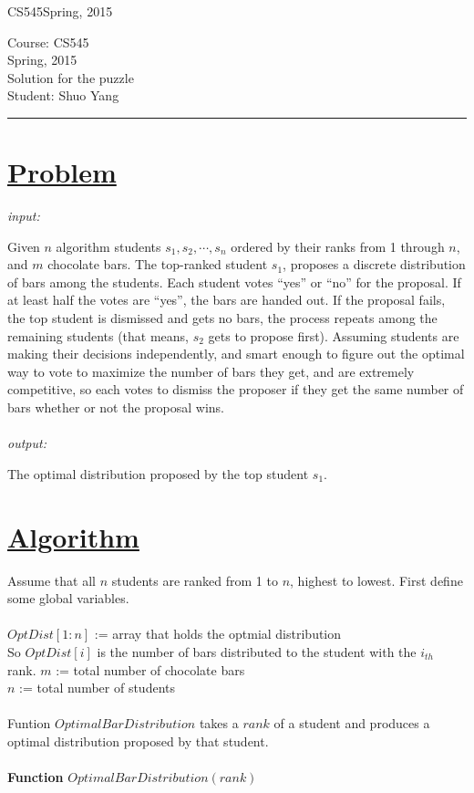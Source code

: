 \documentclass[11pt]{article}
\def\CourseCode{CS545}
\def\DateHandedOut{Spring, 2015}
\def\Author{Shuo Yang}
\begin{document}
\noindent

\CourseCode \hfill \DateHandedOut

\begin{center}
Course: \CourseCode\\
\DateHandedOut\\
Solution for the puzzle\\
Student: \Author\\
\end{center}

\hrule\smallskip

\section*{\underline{Problem}}
\emph{input:}

Given $n$ algorithm students $s_1,s_2,\cdots,s_n$ ordered by their
ranks from 1 through $n$, and 
$m$ chocolate bars. The top-ranked student $s_1$, proposes a discrete
distribution of bars among the students. Each student votes ``yes'' or
``no'' for the proposal. If at least half the votes are ``yes'', the bars
are handed out. If the proposal fails, the top student is dismissed
and gets no bars, the process repeats among the remaining students
(that means, $s_2$ gets to propose first). Assuming students are making
their decisions independently, and smart enough to figure out the
optimal way to vote to maximize the number of bars they get, and are
extremely competitive, so each votes to dismiss the proposer if they
get the same number of bars whether or not the proposal wins.\\\\
\emph{output:}

The optimal distribution proposed by the top student $s_1$.

\section*{\underline{Algorithm}}

Assume that all $n$ students are ranked from 1 to $n$, highest to
lowest. First define some global variables.\\\\ 
$OptDist[1:n]$ := array that holds the optmial distribution\\
So $OptDist[i]$ is the number of bars distributed to the student with
the $i_{th}$ rank.
$m$ := total number of chocolate bars\\
$n$ := total number of students\\\\
Funtion $OptimalBarDistribution$ takes a $rank$ of a student
and produces a optimal distribution proposed by that student.\\\\
\textbf{Function} $OptimalBarDistribution( rank )$\\
\end{document}
